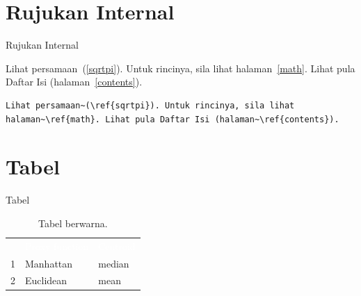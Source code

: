 \documentclass[11pt,            %
               aspectratio=169, %
               xcolor=svgnames,
               t                %
               ]{beamer}
\begin{document}
\section{Rujukan Internal}
\begin{frame}{Rujukan Internal}
\lipsum[3]

\bigskip

Lihat persamaan~(\ref{sqrtpi}). Untuk rincinya, sila lihat halaman~\ref{math}. Lihat pula Daftar Isi (halaman~\ref{contents}).

\begin{block}{}
\begin{verbatim}
Lihat persamaan~(\ref{sqrtpi}). Untuk rincinya, sila lihat
halaman~\ref{math}. Lihat pula Daftar Isi (halaman~\ref{contents}).
\end{verbatim}
\end{block}
\end{frame}

\section{Tabel}
\begin{frame}{Tabel}

\begin{table}
\label{tabExample1}
\caption{Tabel berwarna.}
\begin{center}
\begin{tabular}{cll}
\rowcolor{Brown}\multicolumn{1}{c}{\textcolor{white}{No}} & \multicolumn{1}{c}{\textcolor{white}{Proxy function}} & \multicolumn{1}{c}{\textcolor{white}{Centroid}}\\
\rowcolor{Khaki}1 & Manhattan & median\\
\rowcolor{DarkKhaki}2 & Euclidean & mean
\end{tabular}
\end{center}
\end{table}
\end{frame}
\end{document}
